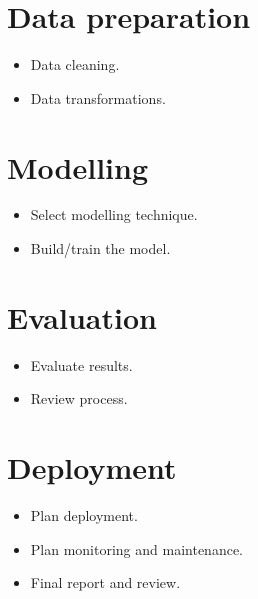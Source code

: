 \section{Data preparation}
\begin{itemize}
    \item Data cleaning.
    \item Data transformations.
\end{itemize}

\section{Modelling}
\begin{itemize}
    \item Select modelling technique.
    \item Build/train the model.
\end{itemize}

\section{Evaluation}
\begin{itemize}
    \item Evaluate results.
    \item Review process.
\end{itemize}

\section{Deployment}
\begin{itemize}
    \item Plan deployment.
    \item Plan monitoring and maintenance.
    \item Final report and review.
\end{itemize}
